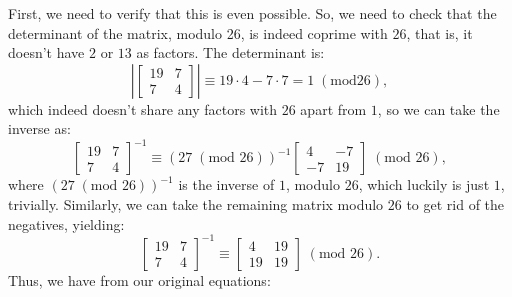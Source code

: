 \documentclass{article}
\begin{document}
\noindent First, we need to verify that this is even possible. So, we need to check that the determinant of the matrix, modulo 26, is indeed coprime with $26$, that is, it doesn't have $2$ or $13$ as factors. The determinant is:
\[
    \left|\begin{bmatrix}
        19 & 7 \\
        7 & 4
    \end{bmatrix}\right| \equiv 19 \cdot 4 - 7 \cdot 7 = 1 \; (\text{mod} 26),
\]
which indeed doesn't share any factors with $26$ apart from $1$, so we can take the inverse as:
\[
    \begin{bmatrix}
        19 & 7 \\
        7 & 4
    \end{bmatrix}^{-1} \equiv (27 \; (\text{mod } 26))^{-1} \begin{bmatrix}
        4 & -7 \\
        -7 & 19
    \end{bmatrix} \; (\text{mod } 26),
\]
where $(27 \; (\text{mod } 26))^{-1}$ is the inverse of $1$, modulo $26$, which luckily is just $1$, trivially. Similarly, we can take the remaining matrix modulo $26$ to get rid of the negatives, yielding:
\[
    \begin{bmatrix}
        19 & 7 \\
        7 & 4
    \end{bmatrix}^{-1} \equiv \begin{bmatrix}
        4 & 19 \\
        19 & 19
    \end{bmatrix} \; (\text{mod } 26).
\]
Thus, we have from our original equations:
\end{document}
